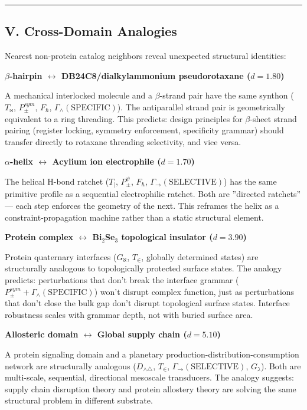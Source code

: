 \documentclass[12pt,a4paper]{article}
\begin{document}
\begin{center}
\rule{0.5\textwidth}{0.4pt}
\end{center}

\subsection{V. Cross-Domain Analogies}

Nearest non-protein catalog neighbors reveal unexpected structural identities:

\textbf{$\beta$-hairpin $\leftrightarrow$ DB24C8/dialkylammonium pseudorotaxane ($d = 1.80$)}

A mechanical interlocked molecule and a $\beta$-strand pair have the same synthon ($T_\bowtie$, $P_\pm^{sym}$, $F_\hbar$, $\Gamma_\wedge(\text{SPECIFIC})$). The antiparallel strand pair is geometrically equivalent to a ring threading. This predicts: design principles for $\beta$-sheet strand pairing (register locking, symmetry enforcement, specificity grammar) should transfer directly to rotaxane threading selectivity, and vice versa.

\textbf{$\alpha$-helix $\leftrightarrow$ Acylium ion electrophile ($d = 1.70$)}

The helical H-bond ratchet ($T_{\vert}$, $P_\pm^\psi$, $F_\hbar$, $\Gamma_\to(\text{SELECTIVE})$) has the same primitive profile as a sequential electrophilic ratchet. Both are ''directed ratchets'' --- each step enforces the geometry of the next. This reframes the helix as a constraint-propagation machine rather than a static structural element.

\textbf{Protein complex $\leftrightarrow$ Bi$_2$Se$_3$ topological insulator ($d = 3.90$)}

Protein quaternary interfaces ($G_\aleph$, $T_\in$, globally determined states) are structurally analogous to topologically protected surface states. The analogy predicts: perturbations that don't break the interface grammar ($P_\pm^{sym} + \Gamma_\wedge(\text{SPECIFIC})$) won't disrupt complex function, just as perturbations that don't close the bulk gap don't disrupt topological surface states. Interface robustness scales with grammar depth, not with buried surface area.

\textbf{Allosteric domain $\leftrightarrow$ Global supply chain ($d = 5.10$)}

A protein signaling domain and a planetary production-distribution-consumption network are structurally analogous ($D_{\wedge\triangle}$, $T_\in$, $\Gamma_\to(\text{SELECTIVE})$, $G_\gimel$). Both are multi-scale, sequential, directional mesoscale transducers. The analogy suggests: supply chain disruption theory and protein allostery theory are solving the same structural problem in different substrate.
\end{document}

